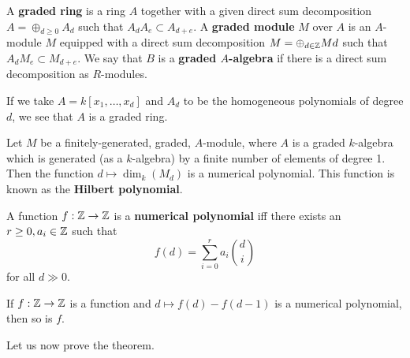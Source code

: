 \documentclass{../mathnotes}
\begin{document}

\begin{lem}
\label{L64}
\end{lem}

\begin{defn}
A \textbf{graded ring} is a ring $A$ together with a given direct sum decomposition $A=\oplus_{d\geq 0}A_d$ such that $A_dA_e\subset A_{d+e}$. A \textbf{graded module} $M$
over $A$ is an $A$-module $M$ equipped with a direct sum decomposition $M=\oplus_{d\in\mathbb{Z}}Md$ such that $A_dM_e\subset M_{d+e}$. We say that $B$ is a \textbf{graded $A$-algebra} if there is a direct sum decomposition as $R$-modules.
\end{defn}

\begin{exmp}
If we take $A=k[x_1,\ldots,x_d]$ and $A_d$ to be the homogeneous polynomials of degree $d$, we see that $A$ is a graded ring.
\end{exmp}

\begin{thm}
\label{L65}
Let $M$ be a finitely-generated, graded, $A$-module, where $A$ is a graded $k$-algebra which is generated (as a $k$-algebra) by a finite number of elements of degree  1. Then the function $d\mapsto \dim_k(M_d)$ is a numerical polynomial. This function is known as the \textbf{Hilbert polynomial}.
\end{thm}

\begin{defn}
A function $f:\mathbb{Z}\to\mathbb{Z}$ is a \textbf{numerical polynomial} iff there exists an $r\geq 0,a_i\in \mathbb{Z}$ such that
\[f(d)=\sum_{i=0}^r a_i\binom{d}{i}\]
for all $d\gg 0$.
\end{defn}

\begin{lem}
\label{L66}
If $f:\mathbb{Z}\to\mathbb{Z}$ is a function and $d\mapsto f(d)-f(d-1)$ is a numerical polynomial, then so is $f$.
\end{lem}

Let us now prove the theorem.
\end{document}

